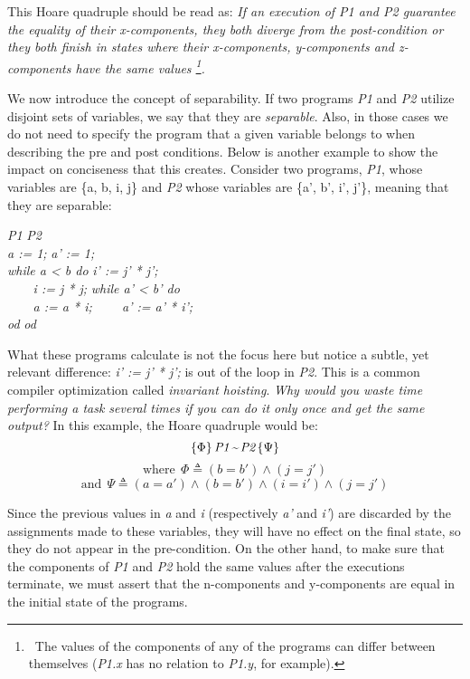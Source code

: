 This Hoare quadruple should be read as: \emph{If an execution of P1 and P2 guarantee the equality of their x-components, they both diverge from the post-condition or they both finish in states where their x-components, y-components and z-components have the same values
\protect\footnote{\ The values of the components of any of the programs can differ between themselves (\emph{P1.x} has no relation to \emph{P1.y}, for example).}.}

We now introduce the concept of separability.
If two programs \emph{P1} and \emph{P2} utilize disjoint sets of variables, we say that they are \emph{separable}.
Also, in those cases we do not need to specify the program that a given variable belongs to when describing the pre and post conditions.
Below is another example to show the impact on conciseness that this creates.
Consider two programs, \emph{P1}, whose variables are \{{a, b, i, j}\} and \emph{P2} whose variables are \{{a', b', i', j'}\}, meaning that they are separable:
\begin{tabbing}
  \hspace{3cm}\= \emph{P1} \hspace{3cm} \= \emph{P2} \\ 
  \> \emph{a := 1;} \> \emph{a' := 1;} \\
  \> \emph{while a < b do} \> \emph{i' := j' * j';} \\
  \> \emph{\ \ \ \ i := j * j;} \> \emph{while a' < b' do} \\
  \> \emph{\ \ \ \ a := a * i;} \> \emph{\ \ \ \ a' := a' * i';} \\
  \> \emph{od} \> \emph{od} 
\end{tabbing}

What these programs calculate is not the focus here but notice a subtle, yet relevant difference: \emph{i' := j' * j';} is out of the loop in \emph{P2}.
This is a common compiler optimization called \emph{invariant hoisting}.
\emph{Why would you waste time performing a task several times if you can do it only once and get the same output?}
In this example, the Hoare quadruple would be:
\[ \{ \Phi \} \, \emph{P1} \, \emph{\textasciitilde} \, \emph{P2} \, \{ \Psi \} \]
\vspace{-20pt} 
\[ \text{where} \ \ \Phi \triangleq (b = b') \land (j = j') \]
\vspace{-25pt} 
\[ \text{and} \ \ \Psi \triangleq (a = a') \land (b = b') \land (i = i') \land (j = j') \]

Since the previous values in \emph{a} and \emph{i} (respectively \emph{a'} and \emph{i'}) are discarded by the assignments made to these variables, they will have no effect on the final state, so they do not appear in the pre-condition.
On the other hand, to make sure that the components of \emph{P1} and \emph{P2} hold the same values after the executions terminate, we must assert that the n-components and y-components are equal in the initial state of the programs. 

